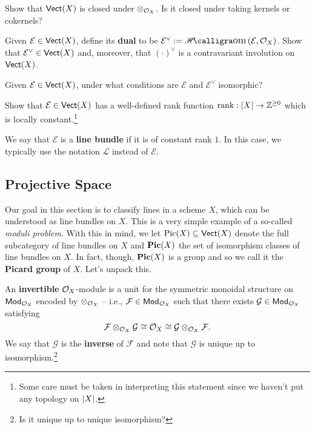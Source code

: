 \documentclass[11pt]{article}
\renewcommand{\F}{\mathcal{F}}
\newcommand{\EE}{\mathcal{E}}
\newcommand{\G}{\mathcal{G}}
\renewcommand{\L}{\mathcal{L}}
\begin{document}
\begin{exercise}
Show that $\operatorname{\mathsf{Vect}}(X)$ is closed under $\otimes_{\mathcal{O}_X}$. Is it closed under taking kernels or cokernels?
\end{exercise}

\begin{exercise}
Given $\EE\in\Vect(X)$, define its \textbf{dual} to be $\EE^{\vee}:=\HHom(\EE,\O_X)$. Show that $\EE^{\vee}\in\Vect(X)$ and, moreover, that $(\cdot)^{\vee}$ is a contravariant involution on $\operatorname{\mathsf{Vect}}(X)$.
\end{exercise}

\begin{exercise}
Given $\EE\in\Vect(X)$, under what conditions are $\EE$ and $\EE^{\vee}$ isomorphic?
\end{exercise}

\begin{exercise}
Show that $\EE\in\Vect(X)$ has a well-defined rank function $\operatorname{rank}: \left\lvert X\right\rvert\to\mathbb{Z}^{\geq0}$ which is locally constant.\footnote{Some care must be taken in interpreting this statement since we haven't put any topology on $\left\lvert X\right\rvert$.}
\end{exercise}

We say that $\EE$ is a \textbf{line bundle} if it is of constant rank $1$. In this case, we typically use the notation $\L$ instead of $\EE$.

\subsection{Projective Space}
Our goal in this section is to classify lines in a scheme $X$, which can be understood as line bundles on $X$. This is a very simple example of a so-called \emph{moduli problem}. With this in mind, we let $\operatorname{Pic}(X)\subseteq\operatorname{\mathsf{Vect}}(X)$ denote the full subcategory of line bundles on $X$ and $\operatorname{\mathbf{Pic}}(X)$ the set of isomorphism classes of line bundles on $X$. In fact, though, $\operatorname{\mathbf{Pic}}(X)$ is a group and so we call it the \textbf{Picard group} of $X$. Let's unpack this.

\begin{definition}
An \textbf{invertible} $\mathcal{O}_X$-module is a unit for the symmetric monoidal structure on $\operatorname{\mathsf{Mod}}_{\mathcal{O}_X}$ encoded by $\otimes_{\mathcal{O}_X}$ -- i.e., $\F\in\Mod_{\O_X}$ such that there exists $\G\in\Mod_{\O_X}$ satisfying 
$$\F\tensor_{\O_X}\G\iso\O_X\iso\G\tensor_{\O_X}\F.$$ 
We say that $\G$ is the \textbf{inverse} of $\F$ and note that $\G$ is unique up to isomorphism.\footnote{Is it unique up to unique isomorphism?}
\end{definition}
\end{document}
